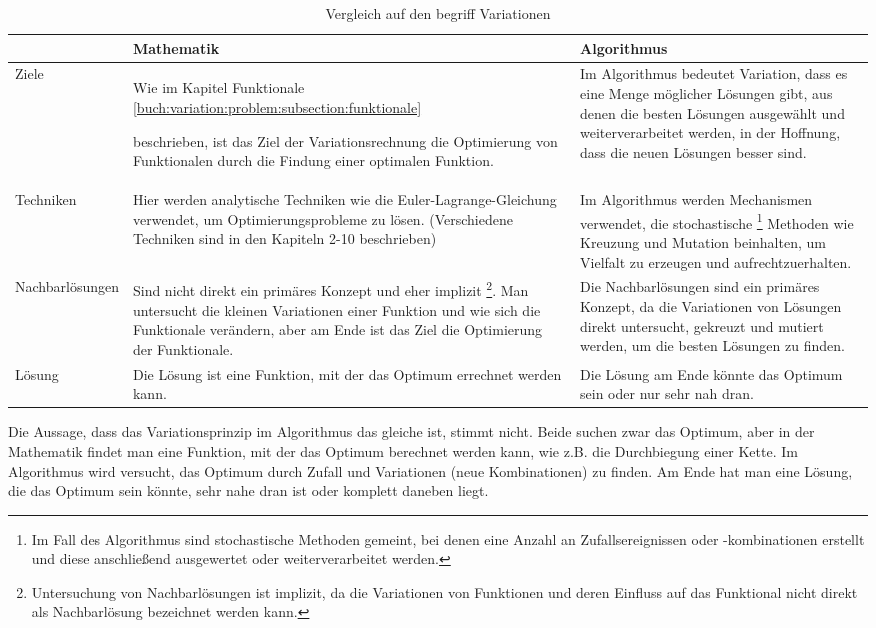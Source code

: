\begin{table}[h]
   \centering
   \begin{tabularx}{\textwidth}{|X|X|X|}
      \hline
       & Mathematik 
       & Algorithmus 
       \\ \hline
      Ziele  
       & Wie im Kapitel Funktionale \ref{buch:variation:problem:subsection:funktionale}

      beschrieben, ist das Ziel der Variationsrechnung die Optimierung von Funktionalen 
      durch die Findung einer optimalen Funktion.
       & Im Algorithmus bedeutet Variation, dass es eine Menge möglicher Lösungen gibt, 
      aus denen die besten Lösungen ausgewählt und weiterverarbeitet werden, in der 
      Hoffnung, dass die neuen Lösungen besser sind.
      \\ \hline
      Techniken  
       & Hier werden analytische Techniken wie die Euler-Lagrange-Gleichung verwendet, 
      um Optimierungsprobleme zu lösen. (Verschiedene Techniken sind in den Kapiteln 
      2-10 beschrieben)
       & Im Algorithmus werden Mechanismen verwendet, die stochastische 
      \footnote{
         Im Fall des Algorithmus sind stochastische Methoden gemeint, bei denen 
         eine Anzahl an Zufallsereignissen oder -kombinationen erstellt und 
         diese anschließend ausgewertet oder weiterverarbeitet werden.
      }
      Methoden wie Kreuzung und Mutation beinhalten, um Vielfalt zu erzeugen und aufrechtzuerhalten.
      \\ \hline
      Nachbarlösungen
       & Sind nicht direkt ein primäres Konzept und eher implizit \footnote{

         Untersuchung von Nachbarlösungen ist implizit, da die Variationen 
         von Funktionen und deren Einfluss auf das Funktional nicht direkt 
         als Nachbarlösung bezeichnet werden kann.
      }. Man untersucht die kleinen Variationen einer Funktion und wie sich 
      die Funktionale verändern, aber am Ende ist das Ziel die Optimierung 
      der Funktionale.
       & Die Nachbarlösungen sind ein primäres Konzept, da die Variationen
      von Lösungen direkt untersucht, gekreuzt und mutiert werden, um die 
      besten Lösungen zu finden.
      \\ \hline
      Lösung
       & Die Lösung ist eine Funktion, mit der das Optimum errechnet werden kann.
       & Die Lösung am Ende könnte das Optimum sein oder nur sehr nah dran.
      \\ \hline
   \end{tabularx}
   \caption{Vergleich auf den begriff Variationen}
   \label{tab:example_bruteforce_cities}
\end{table}

Die Aussage, dass das Variationsprinzip im Algorithmus das gleiche ist, 
stimmt nicht. Beide suchen zwar das Optimum, aber in der Mathematik findet 
man eine Funktion, mit der das Optimum berechnet werden kann, wie z.B. 
die Durchbiegung einer Kette. Im Algorithmus wird versucht, das Optimum 
durch Zufall und Variationen (neue Kombinationen) zu finden. Am Ende 
hat man eine Lösung, die das Optimum sein könnte, sehr nahe dran ist 
oder komplett daneben liegt.
